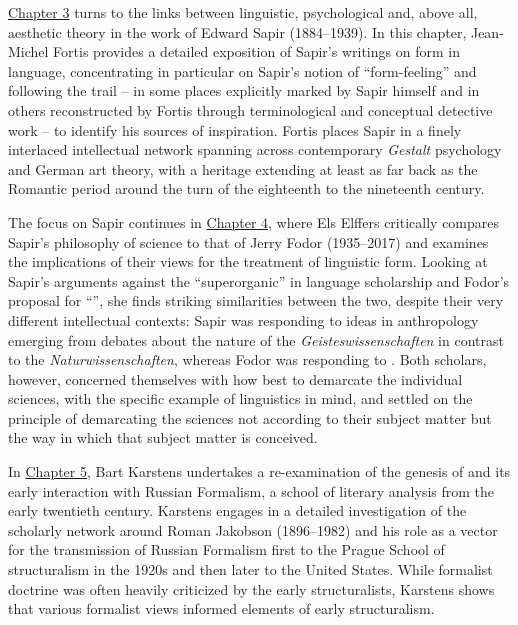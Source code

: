 \documentclass[output=paper]{langscibook}
\begin{document}
\hyperref[chap:fortis]{Chapter 3} turns to the links between linguistic, psychological and, above all, aesthetic theory in the work of Edward Sapir (1884--1939). In this chapter, Jean-Michel Fortis provides a detailed exposition of Sapir's writings on form in language, concentrating in particular on Sapir's notion of ``form-feeling'' and following the trail -- in some places explicitly marked by Sapir himself and in others reconstructed by Fortis through terminological and conceptual detective work -- to identify his sources of inspiration. Fortis places Sapir in a finely interlaced intellectual network spanning across contemporary \emph{Gestalt} psychology and German art theory, with a heritage extending at least as far back as the Romantic period around the turn of the eighteenth to the nineteenth century.

The focus on Sapir continues in \hyperref[chap:elffers]{Chapter 4}, where Els Elffers critically compares Sapir's philosophy of science to that of Jerry Fodor (1935--2017) and examines the implications of their views for the treatment of linguistic form. Looking at Sapir's arguments against the ``superorganic'' in language scholarship and Fodor's proposal for ``'', she finds striking similarities between the two, despite their very different intellectual contexts: Sapir was responding to ideas in anthropology emerging from debates about the nature of the \emph{Geisteswissenschaften} in contrast to the \emph{Naturwissenschaften}, whereas Fodor was responding to . Both scholars, however, concerned themselves with how best to demarcate the individual sciences, with the specific example of linguistics in mind, and settled on the principle of demarcating the sciences not according to their subject matter but the way in which that subject matter is conceived.

In \hyperref[chap:karstens]{Chapter 5}, Bart Karstens undertakes a re-examination of the genesis of  and its early interaction with Russian Formalism, a school of literary analysis from the early twentieth century. Karstens engages in a detailed investigation of the scholarly network around Roman Jakobson (1896--1982) and his role as a vector for the transmission of Russian Formalism first to the Prague School of structuralism in the 1920s and then later to the United States. While formalist doctrine was often heavily criticized by the early structuralists, Karstens shows that various formalist views informed elements of early structuralism.
\end{document}
